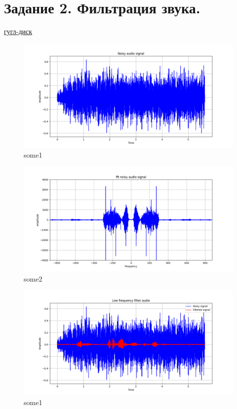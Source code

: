 \documentclass[a4paper, 12pt]{article}
\begin{document}
    \section{Задание 2. Фильтрация звука.}
    \href{https://drive.google.com/drive/folders/1AuXIiKRWvXFOtJqV3uqPzC494zZ7vCrd?usp=sharing}{гугл-диск}


    \begin{figure}[!htb]
        \centering
        \includegraphics[scale=0.485]{noisy_audio.png}
        \captionsetup{skip=0pt}
        \caption{some1}
        \label{fig:fig111}
    \end{figure}
    \begin{figure}[!htb]
        \centering
        \includegraphics[scale=0.485]{U_audio.png}
        \captionsetup{skip=0pt}
        \caption{some2}
        \label{fig:fig112}
    \end{figure}
    \begin{figure}[!htb]
        \centering
        \includegraphics[scale=0.485]{u_flt_u_audio.png}
        \captionsetup{skip=0pt}
        \caption{some1}
        \label{fig:fig113}
    \end{figure}
\end{document}
